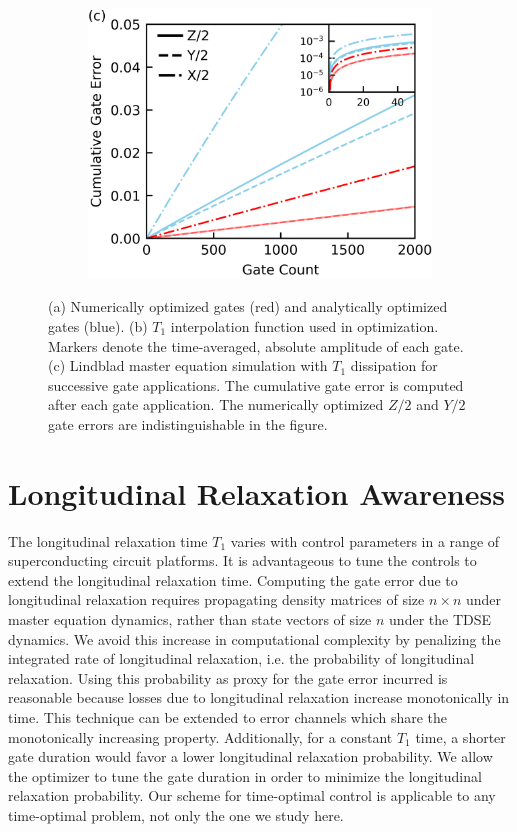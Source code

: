 \begin{figure}[ht]
\begin{subfigure}{.23\textwidth}
  \end{subfigure}\hfill
  \begin{subfigure}{.4\textwidth}
    \includegraphics[width=\linewidth]{assets/f1c.png}
  \end{subfigure}
  \caption{
    (a) Numerically optimized gates (red) and analytically optimized gates (blue).
    (b) $T_{1}$ interpolation function used in optimization. Markers
    denote the time-averaged, absolute amplitude of each gate.
    (c) Lindblad master equation simulation with $T_{1}$ dissipation
    for successive gate applications. The cumulative
    gate error is computed after each gate application.
    The numerically optimized $Z/2$ and $Y/2$ gate errors are indistinguishable
    in the figure.
  }
  \label{fig:longitude}
\end{figure}

\section{Longitudinal Relaxation Awareness \label{sec:longitude}}
The longitudinal relaxation time $T_{1}$ varies with
control parameters in a range of superconducting circuit platforms.
It is advantageous to tune the controls to extend the longitudinal
relaxation time.
Computing the gate error due to longitudinal relaxation
requires propagating density matrices of size $n \times n$ under master equation
dynamics, rather than state vectors of size $n$ under the TDSE dynamics.
We avoid this increase in computational complexity by
penalizing the integrated rate of longitudinal relaxation,
i.e. the probability of longitudinal relaxation.
Using this probability as proxy for the gate error incurred
is reasonable because losses due to longitudinal relaxation
increase monotonically in time.
This technique can be extended to
error channels which share the monotonically increasing property.
Additionally, for a constant $T_{1}$ time, a shorter gate duration
would favor a lower longitudinal relaxation probability. We allow
the optimizer to tune the gate duration in order to minimize the
longitudinal relaxation probability. Our scheme for time-optimal
control is applicable to any time-optimal problem, not only
the one we study here.

